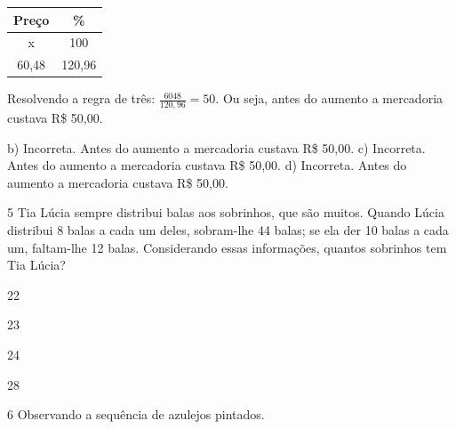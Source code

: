 {{{\begin{escolha}
{{{{{\begin{escolha}
\begin{escolha}
{\begin{q°}
{\begin{escolha}
\begin{escolha}
\begin{escolha}
\begin{escolha}
\begin{escolha}
\begin{escolha}
{{{%
\begin{table}[]
\begin{tabular}{|c|c|}
\hline
\rowcolor[HTML]{DAE8FC} 
\textbf{Preço} & \textbf{\%} \\ \hline
x & 100 \\ \hline
60,48 & 120,96 \\ \hline
\end{tabular}
\end{table}

Resolvendo a regra de três: $\frac{6048}{120,96} = 50$.
Ou seja, antes do aumento a mercadoria custava R\$ 50,00.

b) Incorreta. Antes do aumento a mercadoria custava R\$ 50,00.
c) Incorreta. Antes do aumento a mercadoria custava R\$ 50,00.
d) Incorreta. Antes do aumento a mercadoria custava R\$ 50,00.}

\num{5} Tia Lúcia sempre distribui balas aos sobrinhos, que são muitos. Quando 
Lúcia distribui 8 balas a cada um deles, sobram-lhe 44 balas; se ela der 10
balas a cada um, faltam-lhe 12 balas. Considerando essas informações, quantos
sobrinhos tem Tia Lúcia?

\begin{escolha}

  \item 22

  \item 23

  \item 24

  \item 28

\end{escolha}


\num{6} Observando a sequência de azulejos pintados.

}}
\end{escolha}
\end{escolha}
\end{escolha}
\end{escolha}
\end{escolha}
\end{escolha}}
\end{q°}}
\end{escolha}
\end{escolha}}}}}}
\end{escolha}}}}
